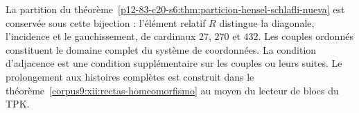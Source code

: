La partition du théorème~\ref{p12-83-c20-s6:thm:particion-hensel-schlafli-nueva}
est conservée sous cette bijection : l’élément relatif \(R\) distingue
la diagonale, l’incidence et le gauchissement, de cardinaux \(27\), \(270\)
et \(432\). Les couples ordonnés constituent le domaine complet du
système de coordonnées. La condition d’adjacence est une condition supplémentaire sur
les couples ou leurs suites. Le prolongement aux histoires complètes est
construit dans le théorème~\ref{corpus9:xii:rectas-homeomorfismo} au moyen
du lecteur de blocs du TPK.

